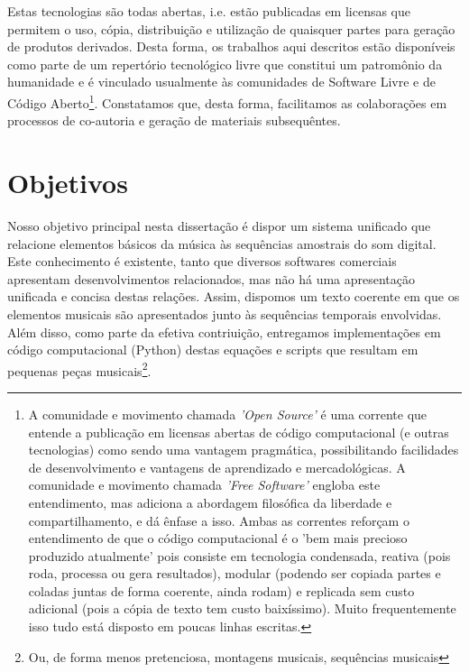 Estas tecnologias são todas abertas, i.e. estão publicadas em licensas que permitem o uso, cópia, distribuição e utilização de quaisquer partes para geração de produtos derivados. Desta forma, os trabalhos aqui descritos estão disponíveis como parte de um repertório tecnológico livre que constitui um patromônio da humanidade e é vinculado usualmente às comunidades de Software Livre e de Código Aberto\footnote{A comunidade e movimento chamada \emph{'Open Source'} é uma corrente que entende a publicação em licensas abertas de código computacional (e outras tecnologias) como sendo uma vantagem pragmática, possibilitando facilidades de desenvolvimento e vantagens de aprendizado e mercadológicas. A comunidade e movimento chamada \emph{'Free Software'} engloba este entendimento, mas adiciona a abordagem filosófica da liberdade e compartilhamento, e dá ênfase a isso. Ambas as correntes reforçam o entendimento de que o código computacional é o 'bem mais  precioso produzido atualmente' pois consiste em tecnologia condensada, reativa (pois roda, processa ou gera resultados), modular (podendo ser copiada partes e coladas juntas de forma coerente, ainda rodam) e replicada sem custo adicional (pois a cópia de texto tem custo baixíssimo). Muito frequentemente isso tudo está disposto em poucas linhas escritas.}. Constatamos que, desta forma, facilitamos as colaborações em processos de co-autoria e geração de materiais subsequêntes.

    \section{Objetivos}
   \label{sec:objetivos}
Nosso objetivo principal nesta dissertação é dispor um sistema unificado que relacione elementos básicos da música às sequências amostrais do som digital. Este conhecimento é existente, tanto que diversos softwares comerciais apresentam desenvolvimentos relacionados, mas não há uma apresentação unificada e concisa destas relações. Assim, dispomos um texto coerente em que os elementos musicais são apresentados junto às sequências temporais envolvidas. Além disso, como parte da efetiva contriuição, entregamos implementações em código computacional (Python) destas equações e scripts que resultam em pequenas peças musicais\footnote{Ou, de forma menos pretenciosa, montagens musicais, sequências musicais}. 


